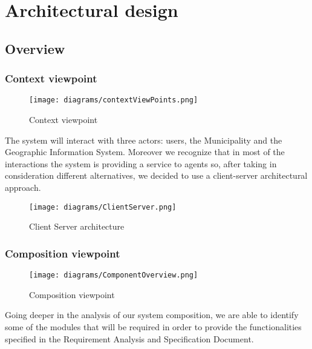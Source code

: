\section{Architectural design}

\subsection{Overview}
	\subsubsection{Context viewpoint}
	
		\begin{figure}[h]
			\centering
			\texttt{[image: diagrams/contextViewPoints.png]}
			\caption{
				\label{fig:contextViewPoint} 
				Context viewpoint
			}
		\end{figure}

		The system will interact with three actors: users, the Municipality and the Geographic Information System.
		Moreover we recognize that in most of the interactions the system is providing a service to agents so, after taking in consideration different alternatives, we decided to use a client-server architectural approach.

		\begin{figure}[h]
			\centering
			\texttt{[image: diagrams/ClientServer.png]}
			\caption{
				\label{fig:ClientServer} 
				Client Server architecture
			}
		\end{figure} 
		
	\subsubsection{Composition viewpoint}
	
		\begin{figure}[h]
			\centering
			\texttt{[image: diagrams/ComponentOverview.png]}
			\caption{
				\label{fig:compositionViewPoint} 
				Composition viewpoint
			}
		\end{figure}
		  
		Going deeper in the analysis of our system composition, we are able to identify some of the modules that will be required in order to provide the functionalities specified in the Requirement Analysis and Specification Document. 
